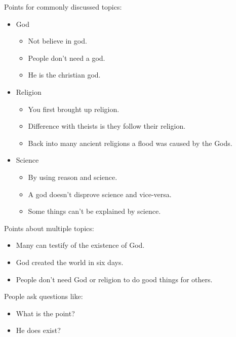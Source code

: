 \documentclass[tikz]{article}
\begin{document}
\begin{multicols}{2}
    Points for commonly discussed topics:
    \begin{itemize}[noitemsep,nolistsep,label={}]
      \item{God}
        \begin{itemize}[noitemsep,nolistsep,label={}]
		\item{Not believe in god.}
		\item{People don't need a god.}
		\item{He is the christian god.}
        \end{itemize}
      \item{Religion}
        \begin{itemize}[noitemsep,nolistsep,label={}]
		\item{You first brought up religion.}
		\item{Difference with theists is they follow their religion.}
		\item{Back into many ancient religions a flood was caused by the Gods.}
        \end{itemize}
      \item{Science}
        \begin{itemize}[noitemsep,nolistsep,label={}]
		\item{By using reason and science.}
		\item{A god doesn't disprove science and vice-versa.}
		\item{Some things can't be explained by science.}
        \end{itemize}
    \end{itemize}

    Points about multiple topics:
    \begin{itemize}[noitemsep,nolistsep,label={}]
		\item{Many can testify of the existence of God.}
		\item{God created the world in six days.}
		\item{People don't need God or religion to do good things for others.}
    \end{itemize}

    People ask questions like:
    \begin{itemize}[noitemsep,nolistsep,label={}]
		\item{What is the point?}
		\item{He does exist?}
    \end{itemize}

    \vfill
    \columnbreak


\end{multicols}
\end{document}
